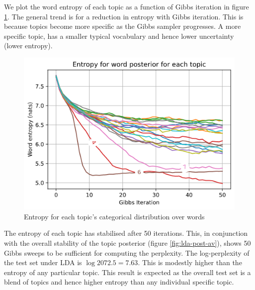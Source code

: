 \documentclass[]{article}
\newcommand{\figwidth}{0.4\linewidth}
\begin{document}
We plot the word entropy of each topic as a function of Gibbs iteration in figure \ref{fig:word-entropy}. The general trend is for a reduction in entropy with Gibbs iteration. This is because topics become more specific as the Gibbs sampler progresses. A more specific topic, has a smaller typical vocabulary and hence lower uncertainty (lower entropy).
%
\begin{figure}[!h]
	\centering
	\includegraphics[width=\figwidth]{word-entropy.png}
	\caption{Entropy for each topic's categorical distribution over words}
	\label{fig:word-entropy}
\end{figure}

The entropy of each topic has stabilised after 50 iterations. This, in conjunction with the overall stability of the topic posterior (figure \ref{fig:lda-post-av}), shows 50 Gibbs sweeps to be sufficient for computing the perplexity. The log-perplexity of the test set under LDA is $\log 2072.5 = 7.63$. This is modestly higher than the entropy of any particular topic. This result is expected as the overall test set is a blend of topics and hence higher entropy than any individual specific topic.
\end{document}

